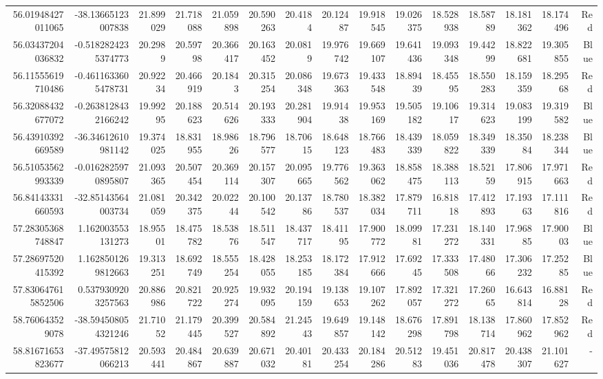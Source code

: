 \begin{center}
\begin{longtable}{rrrrrrrrrrrrrrr}
56.01948427011065 & -38.13665123007838 & 21.899029 & 21.718088 & 21.059898 & 20.590263 & 20.4184 & 20.12487 & 19.918545 & 19.026375 & 18.528938 & 18.58789 & 18.181362 & 18.174496 & Red \\
56.03437204036832 & -0.5182824235374773 & 20.2989 & 20.59798 & 20.366417 & 20.163452 & 20.0819 & 19.976742 & 19.669107 & 19.641436 & 19.093348 & 19.44299 & 18.822681 & 19.305855 & Blue \\
56.11555619710486 & -0.4611633605478731 & 20.92234 & 20.466919 & 20.1843 & 20.315254 & 20.086348 & 19.673363 & 19.433548 & 18.89439 & 18.45595 & 18.550283 & 18.159359 & 18.29568 & Red \\
56.32088432677072 & -0.2638128432166242 & 19.99295 & 20.188623 & 20.514626 & 20.193333 & 20.281904 & 19.91438 & 19.953169 & 19.505182 & 19.10617 & 19.314623 & 19.083199 & 19.319582 & Blue \\
56.43910392669589 & -36.34612610981142 & 19.374025 & 18.831955 & 18.98626 & 18.796577 & 18.70615 & 18.648123 & 18.766483 & 18.439339 & 18.059822 & 18.349339 & 18.35084 & 18.238344 & Blue \\
56.51053562993339 & -0.0162825970895807 & 21.093365 & 20.507454 & 20.369114 & 20.157307 & 20.095665 & 19.776562 & 19.363062 & 18.858475 & 18.388113 & 18.52159 & 17.806915 & 17.971663 & Red \\
56.84143331660593 & -32.85143564003734 & 21.081059 & 20.342375 & 20.02244 & 20.100542 & 20.13786 & 18.780537 & 18.382034 & 17.879711 & 16.81818 & 17.412893 & 17.19363 & 17.111816 & Red \\
57.28305368748847 & 1.162003553131273 & 18.95501 & 18.475782 & 18.53876 & 18.511547 & 18.437717 & 18.41195 & 17.900772 & 18.09981 & 17.231272 & 18.140331 & 17.96885 & 17.90003 & Blue \\
57.28697520415392 & 1.1628501269812663 & 19.313251 & 18.692749 & 18.555254 & 18.428055 & 18.253185 & 18.172384 & 17.912666 & 17.69245 & 17.333508 & 17.48066 & 17.306232 & 17.25285 & Blue \\
57.830647615852506 & 0.5379309203257563 & 20.886986 & 20.821722 & 20.925274 & 19.932095 & 20.194159 & 19.138653 & 19.107262 & 17.892057 & 17.321272 & 17.26065 & 16.643814 & 16.88128 & Red \\
58.760643529078 & -38.594508054321246 & 21.71052 & 21.179445 & 20.399527 & 20.584892 & 21.24543 & 19.649857 & 19.148142 & 18.676298 & 17.891798 & 18.138714 & 17.860962 & 17.852962 & Red \\
58.81671653823677 & -37.49575812066213 & 20.593441 & 20.484867 & 20.639887 & 20.671032 & 20.40181 & 20.433254 & 20.184286 & 20.51283 & 19.451036 & 20.817478 & 20.438307 & 21.101627 & - \\

\end{longtable}
\end{center}
